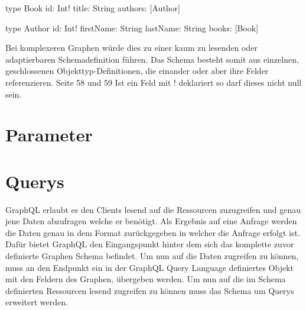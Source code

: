 \begin{JsCode}
type Book {
    id: Int!
    title: String
    authors: [Author]
}
    
type Author {
    id: Int!
    firstName: String
    lastName: String
    books: [Book]
}
\end{JsCode}

Bei komplexeren Graphen würde dies zu einer kaum zu lesenden oder adaptierbaren Schemadefinition führen.
Das Schema besteht somit aus einzelnen, geschlossenen Objekttyp-Definitionen, die einander oder aber ihre Felder referenzieren. Seite 58 und 59
Ist ein Feld mit ! deklariert so darf dieses nicht null sein.



\section{Parameter}

\section{Querys}

GraphQL erlaubt es den Clients lesend auf die Ressourcen zuzugreifen und genau jene Daten abzufragen welche er benötigt.
Als Ergebnis auf eine Anfrage werden die Daten genau in dem Format zurückgegeben in welcher die Anfrage erfolgt ist.
Dafür bietet GraphQL den Eingangspunkt hinter dem sich das komplette zuvor definierte Graphen Schema befindet.
Um nun auf die Daten zugreifen zu können, muss an den Endpunkt ein in der GraphQL Query Language definiertes Objekt mit den Feldern des Graphen, übergeben werden.
Um nun auf die im Schema definierten Ressourcen lesend zugreifen zu können muss das Schema um Querys erweitert werden. 

